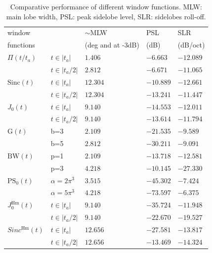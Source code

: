\documentclass[useAMS,usenatbib]{mn2e}
\newcommand{\OMS}[1]{\textcolor{red}{{\bf OMS: #1}}}
\begin{document}
\begin{table}
\centering
\begin{tabular}{||l||ll|l|l||}
\hline
   \footnotesize window  &&{ \footnotesize $\sim$MLW} & { \footnotesize PSL}  & {\footnotesize  SLR}   \\
  \footnotesize functions &&\hspace{-0.8cm}(\footnotesize deg and at -3dB) & \footnotesize (dB) & \footnotesize (dB/oct)  \\
\hline\hline
{\footnotesize $\Pi(t/t_a)$}  & $t\in|t_a|$& $ 1.406$ &$-6.663$ &$-12.089$\\
	    & $t\in|t_a/2|$&$ 2.812$ &$-6.671$ &$-11.065$\\
\hline
{$\mathrm{Sinc}(t)$} & $t\in|t_a|$ &$ 12.304$& $-10.889$&  $-12.661$ \\
	 & $t\in|t_a/2|$ &$ 12.304$& $-13.241$&  $-11.447$ \\
\hline
{$J_0(t)$}& $t\in|t_a|$ &$ 9.140$ &$ -14.553$ & $ -12.011$\\
	  & $t\in|t_a/2|$ &$ 9.140$ &$ -13.614$ & $ -11.794$\\
\hline
{$\mathrm{G}(t)$} & b=3 &$ 2.109$& $-21.535$& $-9.589$\\ 
	 & b=5 &$ 2.812$& $-30.211$& $-9.091$\\ 
\hline
{$\mathrm{BW}(t)$} & p=1 &$ 2.109$ &$-13.718$ & $-12.581$\\
	  & p=3 &$ 4.218$ &$-10.145$ & $-27.330$\\
\hline
{$\mathrm{PS}_0(t)$} & $\alpha=2\pi^3$ &$ 3.515$& $-45.302$& $-7.424$\\ 
	 & $\alpha=5\pi^3$ &$ 4.218$& $-73.597$& $-6.375$\\ 
\hline
{$J_0^\mathrm{Hm}(t)$} & $t\in|t_a|$ &$ 9.140$&$-35.724$ & $-11.948$\\ 
 & $t\in|t_a/2|$ &$ 9.140$&$-22.670$&$-19.527$\\ 
\hline
{$Sinc^\mathrm{Hm}(t)$}  & $t\in|t_a|$ &$ 12.656 $&$-27.581$ &$-13.817$ \\ 
 &$t\in|t_a/2|$ &$12.656$&$-13.469$&$-14.324$\\
 \hline
\end{tabular}
\caption{\label{tab:WF:performance}Comparative performance of 
different window functions. MLW: main lobe width,  PSL: peak sidelobe level, SLR: sidelobes roll-off.}
\end{table}
\end{document}
